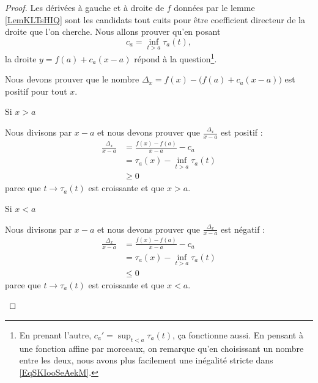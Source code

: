\begin{proof}
    Les dérivées à gauche et à droite de \( f\) données par le lemme \ref{LemKLTsHIQ} sont les candidats tout cuits pour être coefficient directeur de la droite que l'on cherche. Nous allons prouver qu'en posant
    \begin{equation}
        c_a=\inf_{t>a}\tau_a(t),
    \end{equation}
    la droite \( y=f(a)+c_a(x-a)\) répond à la question\footnote{En prenant l'autre, $c_a'=\sup_{t<a}\tau_a(t)$, ça fonctionne aussi. En pensant à une fonction affine par morceaux, on remarque qu'en choisissant un nombre entre les deux, nous avons plus facilement une inégalité stricte dans \eqref{EqSKIooSeAekM}.}.

    Nous devons prouver que le nombre \( \Delta_x=f(x)-\big( f(a)+c_a(x-a) \big)\) est positif pour tout \( x\).
    \begin{subproof}

    \item[Si \( x>a\)]
        
        Nous divisons par \( x-a\) et nous devons prouver que \( \frac{ \Delta_x }{ x-a }\) est positif :
        \begin{subequations}
            \begin{align}
                \frac{ \Delta_x }{ x-a }&=\frac{ f(x)-f(a) }{ x-a }-c_a\\
                &=\tau_a(x)-\inf_{t>a}\tau_a(t)\\
                &\geq 0
            \end{align}
        \end{subequations}
        parce que \( t\to\tau_a(t)\) est croissante et que \( x>a\).

    \item[Si \( x<a\)]
        
        Nous divisons par \( x-a\) et nous devons prouver que \( \frac{ \Delta_x }{ x-a }\) est négatif :
        \begin{subequations}
            \begin{align}
                \frac{ \Delta_x }{ x-a }&=\frac{ f(x)-f(a) }{ x-a }-c_a\\
                &=\tau_a(x)-\inf_{t>a}\tau_a(t)\\
                &\leq 0
            \end{align}
        \end{subequations}
        parce que \( t\to\tau_a(t)\) est croissante et que \( x<a\).
    \end{subproof}
\end{proof}

